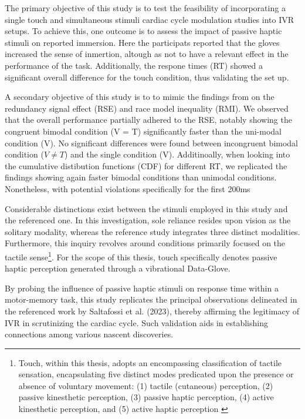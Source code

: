 \documentclass[12pt,oneside,openright]{report}
\begin{document}
The primary objective of this study is to test the feasibility of incorporating a single touch and simultaneous stimuli cardiac cycle modulation studies into IVR setups.
To achieve this, one outcome is to assess the impact of passive haptic stimuli on reported immersion. Here the participats reported that the gloves increased the sense of inmertion, altough as not to have a relevant effect in the performance of the task. Additionally, the respone times (RT) showed a significant overall difference for the touch condition, thus validating the set up.

A secondary objective of this study is to to mimic the findings from \textcite{SALTAFOSSI2023108642} on the redundancy signal effect (RSE) and race model inequality (RMI). We observed that the overall performance partially adhered to the RSE, notably showing the congruent bimodal condition (V = T) significantly faster than the uni-modal condition (V). No significant differences were found between incongruent bimodal condition ($V \neq T$) and the single condition (V). Additinoally, when looking into the cumulative distibution functions (CDF) for different RT, we replicated the findings showing again faster bimodal conditions than unimodal conditions. Nonetheless, with potential violations specifically for the first 200ms


Considerable distinctions exist between the stimuli employed in this study and the referenced one. In this investigation, sole reliance resides upon vision as the solitary modality, whereas the reference study integrates three distinct modalities. Furthermore, this inquiry revolves around conditions primarily focused on the tactile sense\footnote{Touch, within this thesis, adopts an encompassing classification of tactile sensation, encapsulating five distinct modes predicated upon the presence or absence of voluntary movement: (1) tactile (cutaneous) perception, (2) passive kinesthetic perception, (3) passive haptic perception, (4) active kinesthetic perception, and (5) active haptic perception \parencite{Healy2003HandbookOP}}. For the scope of this thesis, touch specifically denotes passive haptic perception generated through a vibrational Data-Glove.

By probing the influence of passive haptic stimuli on response time within a motor-memory task, this study replicates the principal observations delineated in the referenced work by Saltafossi et al. (2023), thereby affirming the legitimacy of IVR in scrutinizing the cardiac cycle. Such validation aids in establishing connections among various nascent discoveries.
\end{document}
